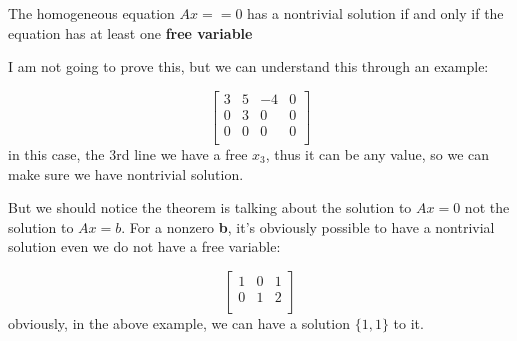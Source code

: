 \begin{theorem}
    The homogeneous equation \(Ax == 0\) has a nontrivial solution if and only if the equation has at least one \textbf{free variable}   
\end{theorem}

I am not going to prove this, but we can understand this through an example:

\[
    \begin{bmatrix}
        3 & 5 & -4 &  0 \\
        0 & 3 & 0 &  0 \\
        0 & 0 & 0 &  0 \\
    \end{bmatrix}
\]
in this case, the 3rd line we have a free \(x_3\), thus it can be any value, so we can make sure we have nontrivial solution. 

But we should notice the theorem is talking about the solution to \(Ax = 0\) not the solution to \(Ax = b\). For a nonzero \textbf{b}, it's obviously possible to have a nontrivial solution even we do not have a free variable:

\[
\begin{bmatrix}
    1 & 0 & 1   \\
    0 & 1 & 2  \\
\end{bmatrix}
\]
obviously, in the above example, we can have a solution \(\{1, 1\}\) to it. 


